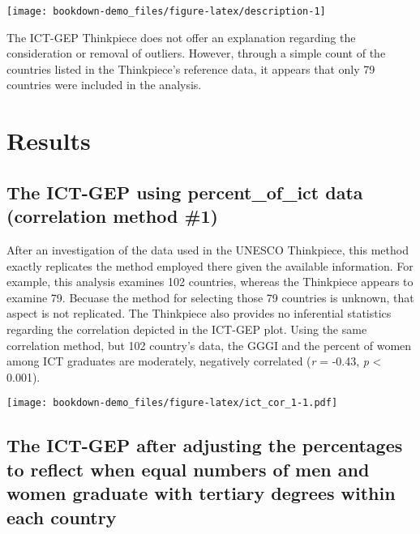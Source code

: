 \documentclass[]{book}
\begin{document}
\begin{center}\texttt{[image: bookdown-demo\_files/figure-latex/description-1]} \end{center}

The ICT-GEP Thinkpiece does not offer an explanation regarding the
consideration or removal of outliers. However, through a simple count of
the countries listed in the Thinkpiece's reference data, it appears that
only 79 countries were included in the analysis.

\chapter{Results}\label{results}

\section{\texorpdfstring{The ICT-GEP using \textbf{percent\_of\_ict}
data (correlation method
\#1)}{The ICT-GEP using percent\_of\_ict data (correlation method \#1)}}\label{the-ict-gep-using-percent_of_ict-data-correlation-method-1}

After an investigation of the data used in the UNESCO Thinkpiece, this
method exactly replicates the method employed there given the available
information. For example, this analysis examines 102 countries, whereas
the Thinkpiece appears to examine 79. Becuase the method for selecting
those 79 countries is unknown, that aspect is not replicated. The
Thinkpiece also provides no inferential statistics regarding the
correlation depicted in the ICT-GEP plot. Using the same correlation
method, but 102 country's data, the GGGI and the percent of women among
ICT graduates are moderately, negatively correlated (\emph{r} = -0.43,
\emph{p} \textless{} 0.001).

\texttt{[image: bookdown-demo\_files/figure-latex/ict\_cor\_1-1.pdf]}

\section{The ICT-GEP after adjusting the percentages to reflect when
equal numbers of men and women graduate with tertiary degrees within
each
country}\label{the-ict-gep-after-adjusting-the-percentages-to-reflect-when-equal-numbers-of-men-and-women-graduate-with-tertiary-degrees-within-each-country}
\end{document}
